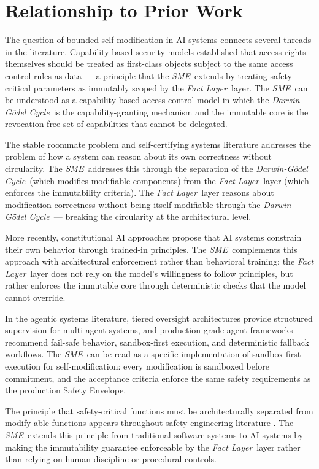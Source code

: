 \documentclass[12pt]{article}
\newcommand{\fact}{\textit{Fact Layer}}
\newcommand{\sme}{\textit{SME}}
\newcommand{\dgcycle}{\textit{Darwin-G\"odel Cycle}}
\begin{document}
\section{Relationship to Prior Work}
\label{sec:prior}

The question of bounded self-modification in AI systems connects several threads in the literature. Capability-based security models \cite{dennis1966} established that access rights themselves should be treated as first-class objects subject to the same access control rules as data — a principle that the \sme\ extends by treating safety-critical parameters as immutably scoped by the \fact\ layer. The \sme\ can be understood as a capability-based access control model in which the \dgcycle\ is the capability-granting mechanism and the immutable core is the revocation-free set of capabilities that cannot be delegated.

The stable roommate problem and self-certifying systems literature \cite{zave1997} addresses the problem of how a system can reason about its own correctness without circularity. The \sme\ addresses this through the separation of the \dgcycle\ (which modifies modifiable components) from the \fact\ layer (which enforces the immutability criteria). The \fact\ layer reasons about modification correctness without being itself modifiable through the \dgcycle\ — breaking the circularity at the architectural level.

More recently, constitutional AI approaches \cite{bai2022} propose that AI systems constrain their own behavior through trained-in principles. The \sme\ complements this approach with architectural enforcement rather than behavioral training: the \fact\ layer does not rely on the model's willingness to follow principles, but rather enforces the immutable core through deterministic checks that the model cannot override.

In the agentic systems literature, tiered oversight architectures \cite{kim2025tao} provide structured supervision for multi-agent systems, and production-grade agent frameworks \cite{alenezi2026} recommend fail-safe behavior, sandbox-first execution, and deterministic fallback workflows. The \sme\ can be read as a specific implementation of sandbox-first execution for self-modification: every modification is sandboxed before commitment, and the acceptance criteria enforce the same safety requirements as the production Safety Envelope.

The principle that safety-critical functions must be architecturally separated from modify-able functions appears throughout safety engineering literature \cite{leveson2011}. The \sme\ extends this principle from traditional software systems to AI systems by making the immutability guarantee enforceable by the \fact\ layer rather than relying on human discipline or procedural controls.
\end{document}
